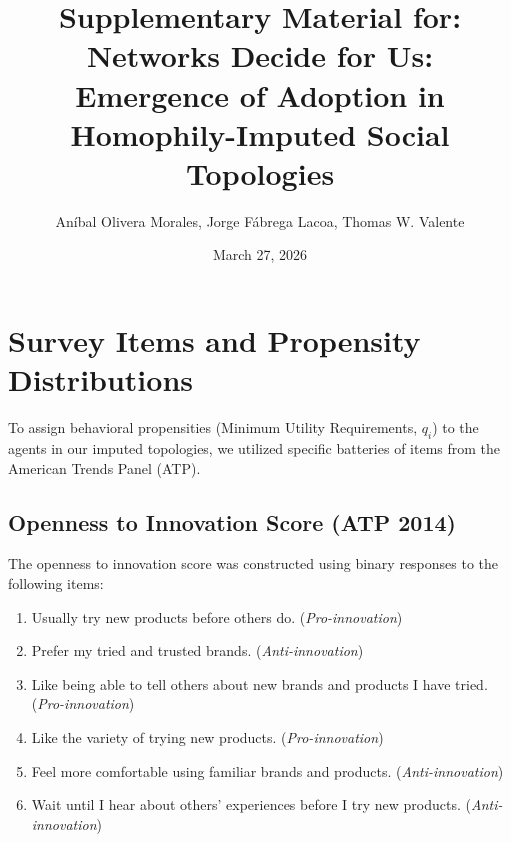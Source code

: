\documentclass[11pt,a4paper]{article}
\title{\Large \textbf{Supplementary Material for:\\Networks Decide for Us: Emergence of Adoption in Homophily-Imputed Social Topologies}}
\author{Aníbal Olivera Morales, Jorge Fábrega Lacoa, Thomas W. Valente}
\date{March 27, 2026}
\begin{document}
\maketitle
\tableofcontents
\vspace{1cm}

\section{Survey Items and Propensity Distributions}

To assign behavioral propensities (Minimum Utility Requirements, $q_i$) to the agents in our imputed topologies, we utilized specific batteries of items from the American Trends Panel (ATP). 

\subsection{Openness to Innovation Score (ATP 2014)}
The openness to innovation score was constructed using binary responses to the following items:
\begin{enumerate}
    \item Usually try new products before others do. (\textit{Pro-innovation})
    \item Prefer my tried and trusted brands. (\textit{Anti-innovation})
    \item Like being able to tell others about new brands and products I have tried. (\textit{Pro-innovation})
    \item Like the variety of trying new products. (\textit{Pro-innovation})
    \item Feel more comfortable using familiar brands and products. (\textit{Anti-innovation})
    \item Wait until I hear about others' experiences before I try new products. (\textit{Anti-innovation})
\end{enumerate}
\end{document}
